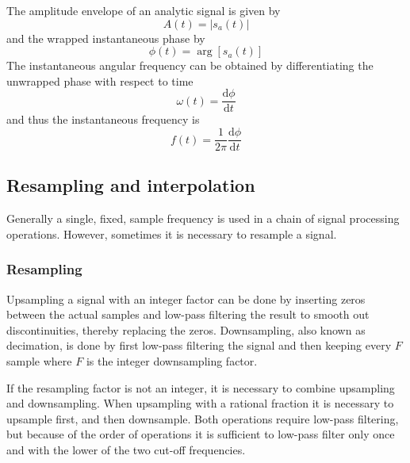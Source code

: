 The amplitude envelope of an analytic signal is given by
\begin{equation}
 A(t) = |s_a(t)|
\end{equation}
and the wrapped instantaneous phase by
\begin{equation}
 \phi(t) = \arg{\left[s_a(t) \right]}
\end{equation}
The instantaneous angular frequency can be obtained by differentiating the unwrapped phase with respect to time
\begin{equation}
 \omega (t) = \frac{\mathrm{d}\phi}{\mathrm{d}t}
\end{equation}
and thus the instantaneous frequency is
\begin{equation}
 f (t) = \frac{1}{2\pi} \frac{\mathrm{d}\phi}{\mathrm{d}t}
\end{equation}

%
%

\subsection{Resampling and interpolation}\label{sec:theory:signal:resampling}
Generally a single, fixed, sample frequency is used in a chain of signal
processing operations. However, sometimes it is necessary to resample a signal.

\subsubsection{Resampling}
Upsampling a signal with an integer factor can be done by inserting zeros
between the actual samples and low-pass filtering the result to smooth out
discontinuities, thereby replacing the zeros. Downsampling, also known as
decimation, is done by first low-pass filtering the signal and then keeping
every $F$ sample where $F$ is the integer downsampling factor.

If the resampling factor is not an integer, it is necessary to combine
upsampling and downsampling. When upsampling with a rational fraction it is
necessary to upsample first, and then downsample. Both operations require
low-pass filtering, but because of the order of operations it is sufficient to
low-pass filter only once and with the lower of the two cut-off frequencies.

